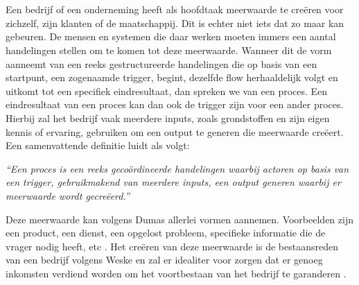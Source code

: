 
\chapter{}%
\label{ch:literatuurstudie}
\section{}%
\label{sec:processen en governance}
Een bedrijf of een onderneming heeft als hoofdtaak meerwaarde te creëren voor zichzelf, zijn klanten of de maatschappij. Dit is echter niet iets dat zo maar kan gebeuren. De mensen en systemen die daar werken moeten immers een aantal handelingen stellen om te komen tot deze meerwaarde. Wanneer dit de vorm aanneemt van een reeks gestructureerde handelingen die op basis van een startpunt, een zogenaamde trigger, begint, dezelfde flow herhaaldelijk volgt en uitkomt tot een specifiek eindresultaat, dan spreken we van een proces. Een eindresultaat van een proces kan dan ook de trigger zijn voor een ander proces. Hierbij zal het bedrijf vaak meerdere inputs, zoals grondstoffen en zijn eigen kennis of ervaring, gebruiken om een output te generen die meerwaarde creëert. Een samenvattende definitie luidt als volgt:
\begin{center}
\textit{“Een proces is een reeks gecoördineerde handelingen waarbij actoren op basis van een trigger, gebruikmakend van meerdere inputs, een output generen waarbij er meerwaarde wordt gecreëerd.”}
\end{center}\newline

Deze meerwaarde kan volgens Dumas allerlei vormen aannemen. Voorbeelden zijn een product, een dienst, een opgelost probleem, specifieke informatie die de vrager nodig heeft, etc \autocite[p. 4]{Dumas2018}. Het creëren van deze meerwaarde is de bestaansreden van een bedrijf volgens Weske en zal er idealiter voor zorgen dat er genoeg inkomsten verdiend worden om het voortbestaan van het bedrijf te garanderen \autocite[p. 5]{Weske2019}. \newline

